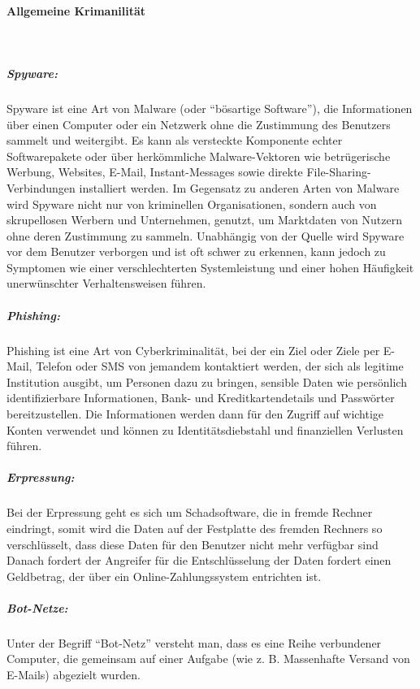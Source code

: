 \paragraph{Allgemeine Krimanilität}\mbox{}\\

\subparagraph{Spyware: }

Spyware ist eine Art von Malware (oder "`bösartige Software"'), die Informationen über einen Computer oder ein Netzwerk ohne die Zustimmung des Benutzers sammelt und weitergibt. Es kann als versteckte Komponente echter Softwarepakete oder über herkömmliche Malware-Vektoren wie betrügerische Werbung, Websites, E-Mail, Instant-Messages sowie direkte File-Sharing-Verbindungen installiert werden. Im Gegensatz zu anderen Arten von Malware wird Spyware nicht nur von kriminellen Organisationen, sondern auch von skrupellosen Werbern und Unternehmen, genutzt, um Marktdaten von Nutzern ohne deren Zustimmung zu sammeln. Unabhängig von der Quelle wird Spyware vor dem Benutzer verborgen und ist oft schwer zu erkennen, kann jedoch zu Symptomen wie einer verschlechterten Systemleistung und einer hohen Häufigkeit unerwünschter Verhaltensweisen führen\cite{spy12}.

\subparagraph{Phishing: }

Phishing ist eine Art von Cyberkriminalität, bei der ein Ziel oder Ziele per E-Mail, Telefon oder SMS von jemandem kontaktiert werden, der sich als legitime Institution ausgibt, um Personen dazu zu bringen, sensible Daten wie persönlich identifizierbare Informationen, Bank- und Kreditkartendetails und Passwörter bereitzustellen. Die Informationen werden dann für den Zugriff auf wichtige Konten verwendet und können zu Identitätsdiebstahl und finanziellen Verlusten führen\cite{phishing17ph}.

\subparagraph{Erpressung: }

Bei der Erpressung geht es sich um Schadsoftware, die in fremde Rechner eindringt, somit wird die Daten auf der Festplatte des fremden Rechners so verschlüsselt, dass diese Daten für den Benutzer nicht mehr verfügbar sind Danach fordert der Angreifer für die Entschlüsselung der Daten fordert einen Geldbetrag, der über ein Online-Zahlungssystem entrichten ist\cite[48]{eckert2013sicherheit}.

\subparagraph{Bot-Netze: }

Unter der Begriff "`Bot-Netz"' versteht man, dass es eine Reihe verbundener Computer, die gemeinsam auf einer Aufgabe (wie z. B. Massenhafte Versand von E-Mails) abgezielt wurden\cite{botnetz17symantec}.

